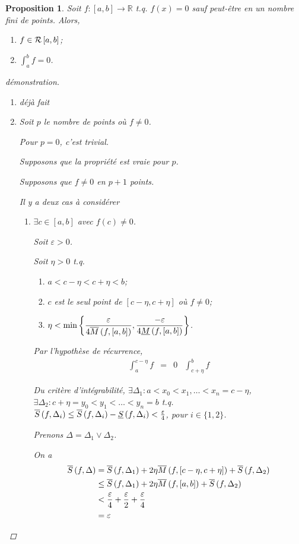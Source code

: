 \documentclass{report}
\newcommand*{\raffinement}[2]{#1 \vee #2}
\newcommand*{\eps}{\varepsilon}
\newcommand*{\reels}{\mathbb{R}}
\newtheorem*{prop}{Proposition}
\theoremstyle{definition}
\theoremstyle{remark}
\begin{document}
	\begin{prop}
		Soit $f:[a,b] \to \reels$ t.q. $f(x)=0$ sauf peut-\^etre en un nombre fini de points. Alors,
		\begin{enumerate}[label=\alph*)]
			\item $f \in \riemann$;
			\item $\int_{a}^{b}f=0$.
		\end{enumerate}
		\begin{proof}[d\'emonstration]~

			\begin{enumerate}[label=\alph*)]
				\item d\'ej\`a fait
				\item Soit $p$ le nombre de points o\`u $f \neq 0$.

				Pour $p=0$, c'est trivial.

				Supposons que la propri\'et\'e est vraie pour $p$.

				Supposons que $f \neq 0$ en $p+1$ points.

				Il y a deux cas \`a consid\'erer
				\begin{enumerate}[label=\arabic*)]
					\item $\exists c \in [a,b]$ avec $f(c) \neq 0$.

					Soit $\eps>0$.

					Soit $\eta>0$ t.q.
					\begin{enumerate}[label=\roman*)]
						\item $a<c-\eta<c+\eta<b$;
						\item $c$ est le seul point de $[c-\eta,c+\eta]$ o\`u $f\neq0$;
						\item $\eta<\min\left\lbrace \dfrac{\eps}{4\msup{f}}, \dfrac{-\eps}{4\minf{f}} \right\rbrace$.
					\end{enumerate}

					Par l'hypoth\`ese de r\'ecurrence,
					\[
					\begin{array}{rcccl}
						\displaystyle\int_{a}^{c-\eta}f&=&0&\displaystyle\int_{c+\eta}^{b}f
					\end{array}
					\]

					Du crit\`ere d'int\'egrabilit\'e, $\exists \Delta_1:a<x_0<x_1,\dotsc<x_n=c-\eta$, $\exists \Delta_2:c+\eta=y_0<y_1<\dotsc<y_n=b$ t.q. $\ssup{f}[\Delta_i] \leq \ssup{f}[\Delta_i]-\sinf{f}[\Delta_i]<\frac{\eps}{4}$, pour $i\in\{1,2\}$.

					Prenons $\Delta=\raffinement{\Delta_1}{\Delta_2}$.

					On a
					\begin{align*}
						\begin{split}
							\ssup{f}&= \ssup{f}[\Delta_1] + 2\eta \msup{f}[c-\eta,c+\eta] + \ssup{f}[\Delta_2]\\
							&\leq \ssup{f}[\Delta_1] + 2\eta \msup{f} + \ssup{f}[\Delta_2]\\
							&< \frac{\eps}{4} + \frac{\eps}{2} + \frac{\eps}{4}\\
							&= \eps
						\end{split}
					\end{align*}


\end{enumerate}
\end{enumerate}
\end{proof}
\end{prop}
\end{document}
